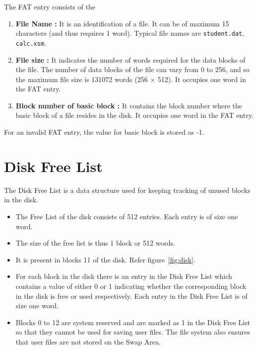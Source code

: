 \documentclass[11pt]{article}
\begin{document}
The FAT entry consists of the
\begin{enumerate}
	\item \textbf{File Name :} It is an identification of a file. It can be of maximum 15 characters (and thus requires 1 word). Typical file names are \texttt{student.dat}, \texttt{calc.xsm}.
	\item \textbf{File size :} It indicates the number of words required for the data blocks of the file. The number of data blocks of the file can vary from 0 to 256, and so the maximum file size is 131072 words (256 $\times$ 512). It occupies one word in the FAT entry.
	\item \textbf{Block number of basic block :} It contains the block number where the basic block of a file resides in the disk. It occupies one word in the FAT entry.
\end{enumerate}

For an invalid FAT entry, the value for basic block is stored as -1.

\section{Disk Free List}
\label{lbl:disklst}
The Disk Free List is a data structure used for keeping tracking of unused blocks in the disk. 


\begin{itemize}
	\item  The Free List of the disk consists of 512 entries. Each entry is of size one word.
	\item  The size of the free list is thus 1 block or 512 words.
	\item  It is present in blocks 11 of the disk. Refer figure~\ref{fig:disk}. 
	\item  For each block in the disk there is an entry in the Disk Free List which contains a value of either 0 or 1 indicating whether the corresponding block in the disk is free or used respectively. Each entry in the Disk Free List is of size one word.  
	\item Blocks 0 to 12 are system reserved and are marked as 1 in the Disk Free List so that they cannot be used for saving user files. The file system also ensures that user files are not stored on the Swap Area.
\end{itemize}
\end{document}

